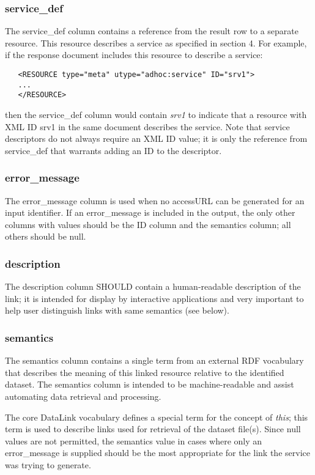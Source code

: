 \documentclass[11pt,a4paper]{ivoa}
\begin{document}
\subsubsection{service\_def}

The service\_def column contains a reference from the result row to
a separate resource. This resource describes a service as specified
in section 4.
For example, if the response document includes this resource
to describe a service:
\begin{verbatim}
   <RESOURCE type="meta" utype="adhoc:service" ID="srv1">
   ...
   </RESOURCE>
\end{verbatim}
then the service\_def column would contain {\em srv1\/} to indicate that
a resource with XML ID srv1 in the same document describes the service.
Note that service descriptors do not always require an XML ID value;
it is only the reference from service\_def that warrants adding
an ID to the descriptor.


\subsubsection{error\_message}

The error\_message column is used when no accessURL can be generated for
an input identifier. If an error\_message is included in the output, the
only other columns with values should be the ID column and the semantics
column; all others should be null.


\subsubsection{description}

The description column SHOULD contain a human-readable description of
the link; it is intended for display by interactive applications and very important to help user distinguish links with same semantics (see below).


\subsubsection{semantics}

The semantics column contains a single term from an external RDF
vocabulary that describes the meaning of this linked resource relative
to the identified dataset. The semantics column is intended to be
machine-readable and assist automating data retrieval and processing.

The core DataLink vocabulary defines a special term for
the concept of {\em this\/};
this term is used to describe links used for retrieval of the
dataset file(s). Since null values are not permitted, the semantics
value in cases where only an error\_message is supplied should be the
most appropriate for the link the service was trying to generate.
\end{document}
